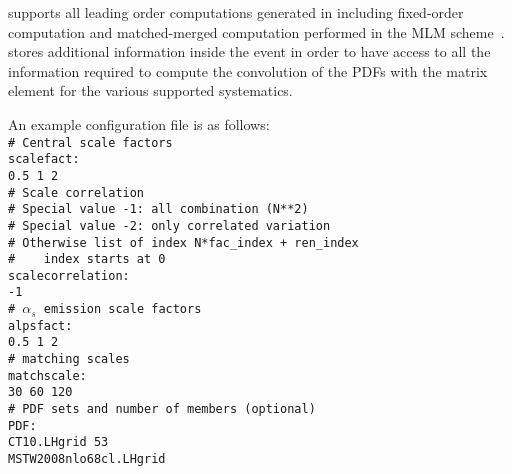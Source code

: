 \syscalc supports all leading order computations generated in \madgraph including fixed-order computation and matched-merged computation performed in the MLM scheme~\cite{Mangano:2006rw}.
\madgraph stores additional information inside the event in order to have access to all the information required to compute the convolution of the PDFs with the matrix element for the various supported systematics.

An example configuration file is as follows:\\[2mm]

{\footnotesize
\texttt{\# Central scale factors \\
scalefact: \\
0.5 1 2\\
\# Scale correlation \\
\# Special value -1: all combination (N**2)\\
\# Special value -2: only correlated variation\\
\# Otherwise list of index N*fac\_index + ren\_index\\
\#\ \ \ \ index starts at 0\\
scalecorrelation: \\
-1 \\
\#   $\alpha_s$ emission scale factors \\
alpsfact:\\
0.5 1 2\\
\#   matching scales\\
matchscale:\\
30 60 120\\
\# PDF sets and number of members (optional)\\
PDF:\\
CT10.LHgrid 53\\
MSTW2008nlo68cl.LHgrid\\[3mm]}
}


